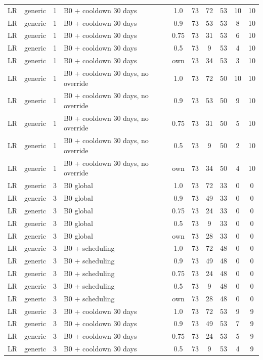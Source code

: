 \begin{longtable}{lllp{4.4cm}cccccc}
LR & generic & 1 & B0 + cooldown 30 days & 1.0 & 73 & 72 & 53 & 10 & 10 \\
LR & generic & 1 & B0 + cooldown 30 days & 0.9 & 73 & 53 & 53 & 8 & 10 \\
LR & generic & 1 & B0 + cooldown 30 days & 0.75 & 73 & 31 & 53 & 6 & 10 \\
LR & generic & 1 & B0 + cooldown 30 days & 0.5 & 73 & 9 & 53 & 4 & 10 \\
LR & generic & 1 & B0 + cooldown 30 days & own & 73 & 34 & 53 & 3 & 10 \\
LR & generic & 1 & B0 + cooldown 30 days, no override & 1.0 & 73 & 72 & 50 & 10 & 10 \\
LR & generic & 1 & B0 + cooldown 30 days, no override & 0.9 & 73 & 53 & 50 & 9 & 10 \\
LR & generic & 1 & B0 + cooldown 30 days, no override & 0.75 & 73 & 31 & 50 & 5 & 10 \\
LR & generic & 1 & B0 + cooldown 30 days, no override & 0.5 & 73 & 9 & 50 & 2 & 10 \\
LR & generic & 1 & B0 + cooldown 30 days, no override & own & 73 & 34 & 50 & 4 & 10 \\
LR & generic & 3 & B0 global & 1.0 & 73 & 72 & 33 & 0 & 0 \\
LR & generic & 3 & B0 global & 0.9 & 73 & 49 & 33 & 0 & 0 \\
LR & generic & 3 & B0 global & 0.75 & 73 & 24 & 33 & 0 & 0 \\
LR & generic & 3 & B0 global & 0.5 & 73 & 9 & 33 & 0 & 0 \\
LR & generic & 3 & B0 global & own & 73 & 28 & 33 & 0 & 0 \\
LR & generic & 3 & B0 + scheduling & 1.0 & 73 & 72 & 48 & 0 & 0 \\
LR & generic & 3 & B0 + scheduling & 0.9 & 73 & 49 & 48 & 0 & 0 \\
LR & generic & 3 & B0 + scheduling & 0.75 & 73 & 24 & 48 & 0 & 0 \\
LR & generic & 3 & B0 + scheduling & 0.5 & 73 & 9 & 48 & 0 & 0 \\
LR & generic & 3 & B0 + scheduling & own & 73 & 28 & 48 & 0 & 0 \\
LR & generic & 3 & B0 + cooldown 30 days & 1.0 & 73 & 72 & 53 & 9 & 9 \\
LR & generic & 3 & B0 + cooldown 30 days & 0.9 & 73 & 49 & 53 & 7 & 9 \\
LR & generic & 3 & B0 + cooldown 30 days & 0.75 & 73 & 24 & 53 & 5 & 9 \\
LR & generic & 3 & B0 + cooldown 30 days & 0.5 & 73 & 9 & 53 & 4 & 9 \\

\end{longtable}
